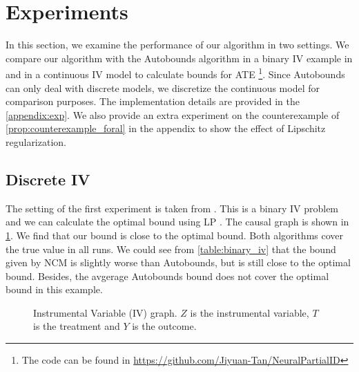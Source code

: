 \documentclass[12pt]{article}
\theoremstyle{plain}
\theoremstyle{definition}
\theoremstyle{remark}
\begin{document}
\section{Experiments} \label{sec:exp}
In this section, we examine the performance of our algorithm in two settings. We compare our algorithm with the Autobounds algorithm \cite{duarteAutomatedApproachCausal2021} in a binary IV example in \cite{duarteAutomatedApproachCausal2021} and in a continuous IV model to calculate bounds for ATE \footnote{The code can be found in \hyperlink{here}{https://github.com/Jiyuan-Tan/NeuralPartialID}}. Since Autobounds can only deal with discrete models, we discretize the continuous model for comparison purposes. The implementation details are provided in the \cref{appendix:exp}.  We also provide an extra experiment on the counterexample of \cref{prop:counterexample_foral} in the appendix to show the effect of Lipschitz regularization. 
\subsection{Discrete IV }
The setting of the first experiment is taken from \cite[Section D.1]{duarteAutomatedApproachCausal2021}. This is a binary IV problem and we can calculate the optimal bound using LP \cite{balkeCounterfactualProbabilitiesComputational1994}. The causal graph is shown in \cref{fig:iv_graph}. We find that our bound is close to the optimal bound. Both algorithms cover the true value in all runs. We could see from \cref{table:binary_iv} that the bound given by NCM is slightly worse than Autobounds, but is still close to the optimal bound. Besides, the avgerage Autobounds bound does not cover the optimal bound in this example.
\begin{figure}[!htb]
    \centering
    \caption{Instrumental Variable (IV) graph. $Z$ is the instrumental variable, $T$ is the treatment and $Y$ is the outcome.}
    \label{fig:iv_graph}
\end{figure}
\end{document}
